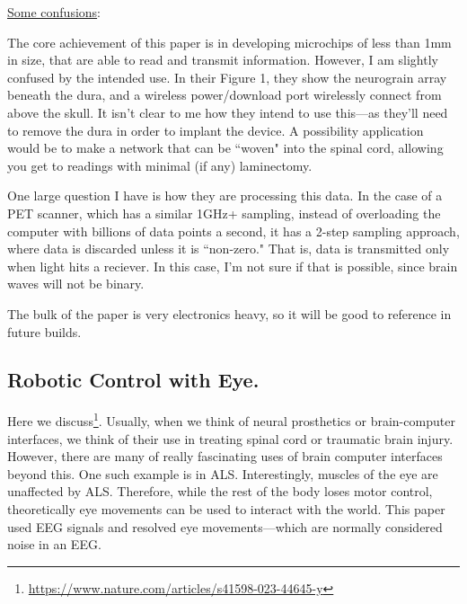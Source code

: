 \underline{Some confusions}:

The core achievement of this paper is in developing microchips of less than 1mm in size, that are able to read and transmit information. However, I am slightly confused by the intended use. In their Figure 1, they show the neurograin array beneath the dura, and a wireless power/download port wirelessly connect from above the skull. It isn't clear to me how they intend to use this---as they'll need to remove the dura in order to implant the device. A possibility application would be to make a network that can be ``woven" into the spinal cord, allowing you get to readings with minimal (if any) laminectomy. \newline

One large question I have is how they are processing this data. In the case of a PET scanner, which has a similar 1GHz+ sampling, instead of overloading the computer with billions of data points a second, it has a 2-step sampling approach, where data is discarded unless it is ``non-zero." That is, data is transmitted only when light hits a reciever. In this case, I'm not sure if that is possible, since brain waves will not be binary.\newline

The bulk of the paper is very electronics heavy, so it will be good to reference in future builds. 


\subsection{Robotic Control with Eye.}

Here we discuss\footnote{\url{https://www.nature.com/articles/s41598-023-44645-y}}. Usually, when we think of neural prosthetics or brain-computer interfaces, we think of their use in treating spinal cord or traumatic brain injury. However, there are many of really fascinating uses of brain computer interfaces beyond this. One such example is in ALS. Interestingly, muscles of the eye are unaffected by ALS. Therefore, while the rest of the body loses motor control, theoretically eye movements can be used to interact with the world. This paper used EEG signals and resolved eye movements---which are normally considered noise in an EEG.\newline

